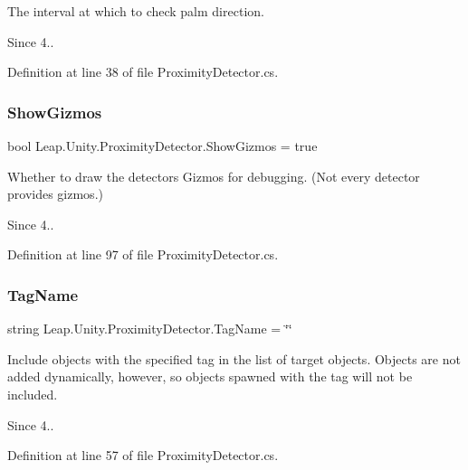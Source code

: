 The interval at which to check palm direction. \begin{DoxySince}{Since}
4.. 
\end{DoxySince}


Definition at line 38 of file Proximity\+Detector.\+cs.

\mbox{\label{class_leap_1_1_unity_1_1_proximity_detector_a168a600ee9c5b723b2ab546958429cb8}} 
\subsubsection{\texorpdfstring{ShowGizmos}{ShowGizmos}}
{\footnotesize\ttfamily bool Leap.\+Unity.\+Proximity\+Detector.\+Show\+Gizmos = true}

Whether to draw the detector\textquotesingle{}s Gizmos for debugging. (Not every detector provides gizmos.) \begin{DoxySince}{Since}
4.. 
\end{DoxySince}


Definition at line 97 of file Proximity\+Detector.\+cs.

\mbox{\label{class_leap_1_1_unity_1_1_proximity_detector_a4142f9e67a2936e6c1c56521c566f710}} 
\subsubsection{\texorpdfstring{TagName}{TagName}}
{\footnotesize\ttfamily string Leap.\+Unity.\+Proximity\+Detector.\+Tag\+Name = \char`\"{}\char`\"{}}

Include objects with the specified tag in the list of target objects. Objects are not added dynamically, however, so objects spawned with the tag will not be included. \begin{DoxySince}{Since}
4.. 
\end{DoxySince}


Definition at line 57 of file Proximity\+Detector.\+cs.

\mbox{\label{class_leap_1_1_unity_1_1_proximity_detector_a5a588af860f86f0116c919fa8fada465}} 
